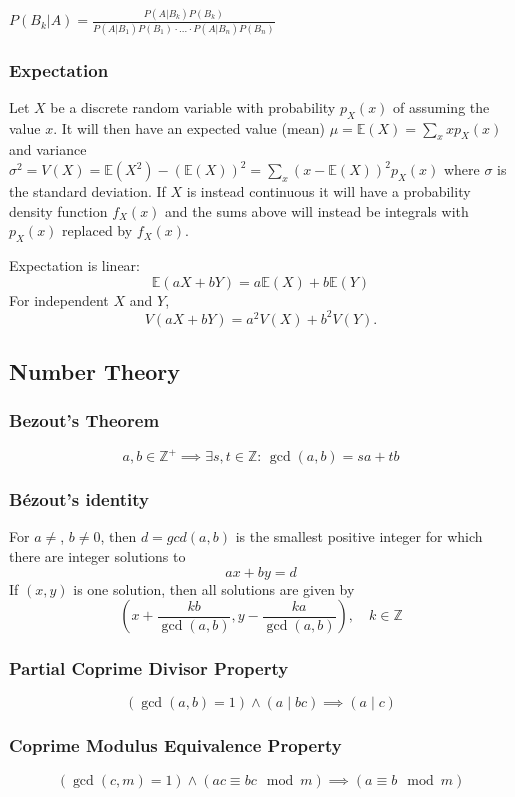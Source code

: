 \documentclass[
	a4paper,
	landscape,
	10pt,
]{article}
\begin{document}
\begin{multicols}{3}
        $P(B_k|A) = \frac{P(A|B_k)P(B_k)}{P(A|B_1)P(B_1) \cdot ... \cdot P(A|B_n)P(B_n)}$

        \subsubsection*{Expectation}

        Let $X$ be a discrete random variable with probability $p_X(x)$ of assuming the value $x$. It will then have an expected value (mean) $\mu=\mathbb{E}(X)=\sum_xxp_X(x)$ and variance $\sigma^2=V(X)=\mathbb{E}(X^2)-(\mathbb{E}(X))^2=\sum_x(x-\mathbb{E}(X))^2p_X(x)$ where $\sigma$ is the standard deviation. If $X$ is instead continuous it will have a probability density function $f_X(x)$ and the sums above will instead be integrals with $p_X(x)$ replaced by $f_X(x)$.

	Expectation is linear:
	\[\mathbb{E}(aX+bY) = a\mathbb{E}(X)+b\mathbb{E}(Y)\]
	For independent $X$ and $Y$, \[V(aX+bY) = a^2V(X)+b^2V(Y).\]

    \subsection{Number Theory}
        \subsubsection*{Bezout's Theorem}
        $$
        a,b \in \mathbb{Z^+} \implies \exists s,t \in \mathbb{Z}: \, \gcd(a,b) = sa + tb
        $$
        \subsubsection*{Bézout's identity}
	For $a \neq $, $b \neq 0$, then $d=gcd(a,b)$ is the smallest positive integer for which there are integer solutions to
	$$ax+by=d$$
	If $(x,y)$ is one solution, then all solutions are given by
	$$\left(x+\frac{kb}{\gcd(a,b)}, y-\frac{ka}{\gcd(a,b)}\right), \quad k\in\mathbb{Z}$$

        \subsubsection*{Partial Coprime Divisor Property}
        $$
        (\gcd(a,b)=1) \land (a \mid bc) \implies (a \mid c)
        $$
        \subsubsection*{Coprime Modulus Equivalence Property}
        $$
        (\gcd(c,m)=1) \land (ac \equiv bc \mod m) \implies (a \equiv b \mod m)
        $$

\end{multicols}
\end{document}
